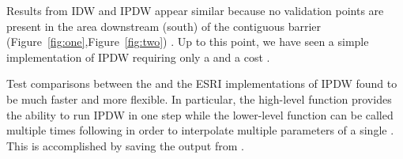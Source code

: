 \documentclass[nojss,shortnames]{jss}
\begin{document}
Results from IDW and IPDW appear similar because no validation points are present in the area downstream (south) of the contiguous barrier (Figure~\ref{fig:one},Figure~\ref{fig:two}) . Up to this point, we have seen a simple implementation of IPDW requiring only a  and a cost . 

Test comparisons between the  and the ESRI \citep{mitchell2012,suominen2010} implementations of IPDW found  to be much faster and more flexible. In particular, the high-level function  provides the ability to run IPDW in one step while the lower-level function  can be called multiple times following  in order to interpolate multiple parameters of a single . This is accomplished by saving the output from .

\setlength{\bibsep}{0pt}


\end{document}
